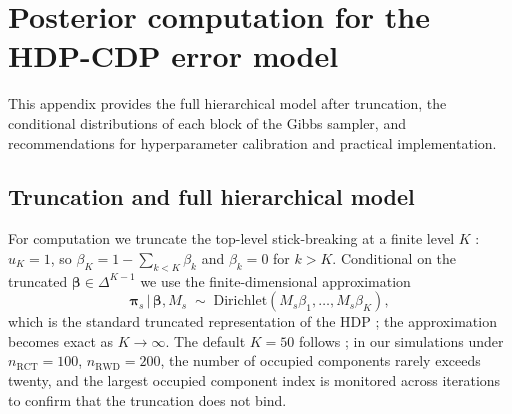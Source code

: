 \documentclass[11pt]{article}
\newcommand{\given}{\,|\,}
\begin{document}

\appendix

\section{Posterior computation for the HDP-CDP error model}
\label{app:hdp-sampler}

This appendix provides the full hierarchical model after truncation, the conditional distributions of each block of the Gibbs sampler, and recommendations for hyperparameter calibration and practical implementation.

\subsection{Truncation and full hierarchical model}
\label{app:hdp-truncated}

For computation we truncate the top-level stick-breaking at a finite level $K$ \citep{ishwaran2001gibbs}: $u_K = 1$, so $\beta_K = 1 - \sum_{k < K} \beta_k$ and $\beta_k = 0$ for $k > K$. Conditional on the truncated $\bm{\beta} \in \Delta^{K-1}$ we use the finite-dimensional approximation
\begin{equation}
\bm{\pi}_s \given \bm{\beta}, M_s \;\sim\; \mathrm{Dirichlet}(M_s \beta_1, \ldots, M_s \beta_K),
\label{eq:hdp-pi-prior}
\end{equation}
which is the standard truncated representation of the HDP \citep{teh2006hierarchical, wang2009variational}; the approximation becomes exact as $K \to \infty$. The default $K = 50$ follows \citet{henderson2020individualized}; in our simulations under $n_{\mathrm{RCT}} = 100$, $n_{\mathrm{RWD}} = 200$, the number of occupied components rarely exceeds twenty, and the largest occupied component index is monitored across iterations to confirm that the truncation does not bind.
\end{document}
